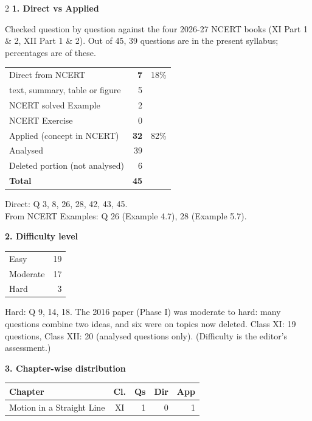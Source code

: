 \vspace{4pt}
\begin{multicols}{2}
\textbf{\color{crimson}1. Direct vs Applied}\par\smallskip
{\footnotesize Checked question by question against the four 2026-27 NCERT books (XI Part 1 \& 2, XII Part 1 \& 2). Out of 45, 39 questions are in the present syllabus; percentages are of these.}\par\smallskip
\begin{tabular}{@{}lrr@{}}\toprule
Direct from NCERT & \textbf{7} & 18\%\\
\quad text, summary, table or figure & 5 &\\
\quad NCERT solved Example & 2 &\\
\quad NCERT Exercise & 0 &\\
Applied (concept in NCERT) & \textbf{32} & 82\%\\\midrule
Analysed & 39 &\\
Deleted portion (not analysed) & 6 &\\\midrule
\textbf{Total} & \textbf{45} &\\\bottomrule\end{tabular}\par\smallskip
{\footnotesize Direct: Q 3, 8, 26, 28, 42, 43, 45.\\ From NCERT Examples: Q 26 (Example 4.7), 28 (Example 5.7).}\par\medskip
\textbf{\color{crimson}2. Difficulty level}\par\smallskip
\begin{tabular}{@{}lr@{}}\toprule
Easy & 19\\ Moderate & 17\\ Hard & 3\\\bottomrule\end{tabular}\par\smallskip
{\footnotesize Hard: Q 9, 14, 18. The 2016 paper (Phase I) was moderate to hard: many questions combine two ideas, and six were on topics now deleted. Class XI: 19 questions, Class XII: 20 (analysed questions only). (Difficulty is the editor's assessment.)}\par\medskip
\columnbreak
\textbf{\color{crimson}3. Chapter-wise distribution}\par\smallskip
{\footnotesize\begin{tabular}{@{}p{4.7cm}c@{\,}r@{\,}r@{\,}r@{}}\toprule
Chapter & Cl. & Qs & Dir & App\\\midrule
Motion in a Straight Line & XI & 1 & 0 & 1\\

\end{tabular}}
\end{multicols}
